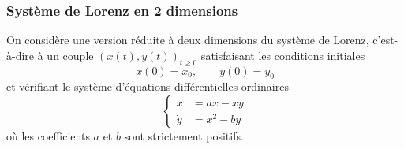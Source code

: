 \subsubsection{Système de Lorenz en 2 dimensions} 

On considère une version réduite à deux dimensions du système de Lorenz, c'est-à-dire à un couple $(x(t), y(t))_{t \geq 0}$ satisfaisant les conditions initiales
$$
x(0) = x_0, \qquad y(0) = y_0
$$
et vérifiant le système d'équations différentielles ordinaires
\begin{equation} \label{eq:lorenz2D}
  \left\{\begin{array}{rcl}
    \dot x & = a x - xy \\
    \dot y & = x^2 - by
  \end{array}\right.
\end{equation}
où les coefficients $a$ et $b$ sont strictement positifs.

\bigskip
